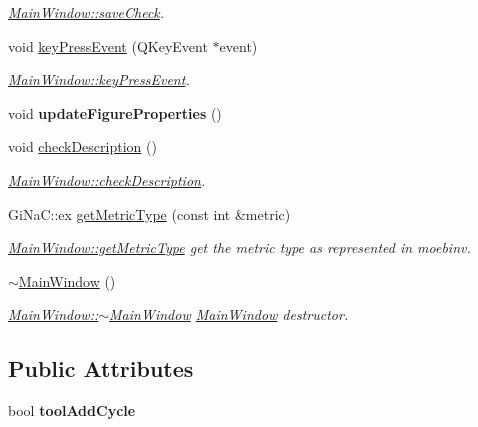 \begin{DoxyCompactItemize}
\begin{DoxyCompactList}\small\item\em \mbox{\hyperlink{class_main_window_ae2defb68c51e884b7031693b20bdd556}{Main\+Window\+::save\+Check}}. \end{DoxyCompactList}\item 
void \mbox{\hyperlink{class_main_window_a9c4f542263838b9ecd06eae839a42a34}{key\+Press\+Event}} (Q\+Key\+Event $\ast$event)
\begin{DoxyCompactList}\small\item\em \mbox{\hyperlink{class_main_window_a9c4f542263838b9ecd06eae839a42a34}{Main\+Window\+::key\+Press\+Event}}. \end{DoxyCompactList}\item 
\mbox{\label{class_main_window_af99d72b486f296b0cd86f2f9021a6343}} 
void {\bfseries update\+Figure\+Properties} ()
\item 
void \mbox{\hyperlink{class_main_window_a3e72a214988b3628c36ad4f3e41dc0af}{check\+Description}} ()
\begin{DoxyCompactList}\small\item\em \mbox{\hyperlink{class_main_window_a3e72a214988b3628c36ad4f3e41dc0af}{Main\+Window\+::check\+Description}}. \end{DoxyCompactList}\item 
Gi\+Na\+C\+::ex \mbox{\hyperlink{class_main_window_afa9a4efe6ebf3ab77ec807346d792732}{get\+Metric\+Type}} (const int \&metric)
\begin{DoxyCompactList}\small\item\em \mbox{\hyperlink{class_main_window_afa9a4efe6ebf3ab77ec807346d792732}{Main\+Window\+::get\+Metric\+Type}} get the metric type as represented in moebinv. \end{DoxyCompactList}\item 
\mbox{\label{class_main_window_ae98d00a93bc118200eeef9f9bba1dba7}} 
\mbox{\hyperlink{class_main_window_ae98d00a93bc118200eeef9f9bba1dba7}{$\sim$\+Main\+Window}} ()
\begin{DoxyCompactList}\small\item\em \mbox{\hyperlink{class_main_window_ae98d00a93bc118200eeef9f9bba1dba7}{Main\+Window\+::$\sim$\+Main\+Window}} \mbox{\hyperlink{class_main_window}{Main\+Window}} destructor. \end{DoxyCompactList}\end{DoxyCompactItemize}
\subsection*{Public Attributes}
\begin{DoxyCompactItemize}
\item 
\mbox{\label{class_main_window_ada1631bee647fb176facf5077da7f91c}} 
bool {\bfseries tool\+Add\+Cycle}
\end{DoxyCompactItemize}


